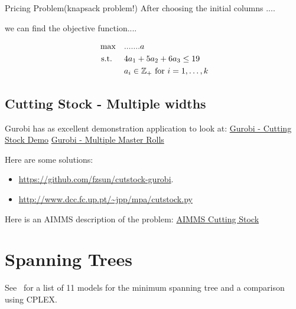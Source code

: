 \documentclass[../open-optimization/open-optimization.tex]{subfiles}
\begin{document}
\begin{example}{Pricing Problem}{(knapsack problem!)}
After choosing the initial columns .... 

we can find the objective function.... 


\begin{equation}
\begin{split}
\max\quad  & .......a\\
\text{ s.t. } \quad & 4 a_1 + 5 a_2 + 6 a_3 \leq 19\\
& a_i \in {\mathbb{Z}}_+ \text{ for } i=1, \dots, k
\end{split}
\end{equation}
\end{example}
\subsection{Cutting Stock - Multiple widths}
Gurobi has as excellent demonstration application to look at:
\href{https://demos.gurobi.com/cutstock/}{Gurobi - Cutting Stock Demo}
\href{https://www.gurobi.com/cutting-stock-problem-with-multiple-master-rolls/}{Gurobi - Multiple Master Rolls}



Here are some solutions:
\begin{itemize}
\item  \url{https://github.com/fzsun/cutstock-gurobi}.
\item \url{http://www.dcc.fc.up.pt/~jpp/mpa/cutstock.py}
\end{itemize}


Here is an AIMMS description of the problem: 
\href{https://download.aimms.com/aimms/download/manuals/AIMMS3OM_CuttingStock.pdf}{AIMMS Cutting Stock}



\section{Spanning Trees}
\label{sec:spanning-tree-models}

%
%
%
%
See~\cite{Abdelmaguid2018} for a list of 11 models for the minimum spanning tree and a comparison using CPLEX.
\end{document}

